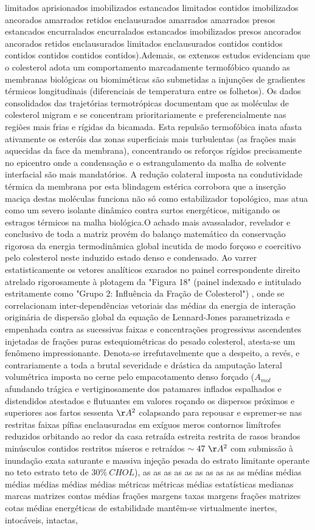 limitados aprisionados imobilizados estancados limitados contidos imobilizados ancorados amarrados retidos enclausurados amarrados amarrados presos estancados encurralados encurralados estancados imobilizados presos ancorados ancorados retidos enclausurados limitados enclausurados contidos contidos contidos contidos contidos contidos).Ademais, os extensos estudos evidenciam que o colesterol adota um comportamento marcadamente termofóbico quando as membranas biológicas ou biomiméticas são submetidas a injunções de gradientes térmicos longitudinais (diferenciais de temperatura entre os folhetos). Os dados consolidados das trajetórias termotrópicas documentam que as moléculas de colesterol migram e se concentram prioritariamente e preferencialmente nas regiões mais frias e rígidas da bicamada. Esta repulsão termofóbica inata afasta ativamente os esteróis das zonas superficiais mais turbulentas (as frações mais aquecidas da face da membrana), concentrando os reforços rígidos precisamente no epicentro onde a condensação e o estrangulamento da malha de solvente interfacial são mais mandatórios. A redução colateral imposta na condutividade térmica da membrana por esta blindagem estérica corrobora que a inserção maciça destas moléculas funciona não só como estabilizador topológico, mas atua como um severo isolante dinâmico contra surtos energéticos, mitigando os estragos térmicos na malha biológica.O achado mais avassalador, revelador e conclusivo de toda a matriz provém do balanço matemático da conservação rigorosa da energia termodinâmica global incutida de modo forçoso e coercitivo pelo colesterol neste induzido estado denso e condensado. Ao varrer estatisticamente os vetores analíticos exarados no painel correspondente direito atrelado rigorosamente à plotagem da "Figura 18" (painel indexado e intitulado estritamente como "Grupo 2: Influência da Fração de Colesterol") , onde se correlacionam inter-dependências vetoriais das médias da energia de interação originária de dispersão global da equação de Lennard-Jones parametrizada e empenhada contra as sucessivas faixas e concentrações progressivas ascendentes injetadas de frações puras estequiométricas do pesado colesterol, atesta-se um fenômeno impressionante. Denota-se irrefutavelmente que a despeito, a revés, e contrariamente a toda a brutal severidade e drástica da amputação lateral volumétrica imposta no cerne pelo empacotamento denso forçado ($A_{mol}$ afundando trágica e vertiginosamente dos patamares inflados espalhados e distendidos atestados e flutuantes em valores roçando os dispersos próximos e superiores aos fartos sessenta $\AA^2$ colapsando para repousar e espremer-se nas restritas faixas pífias enclausuradas em exíguos meros contornos limítrofes reduzidos orbitando ao redor da casa retraída estreita restrita de rasos brandos minúsculos contidos restritos míseros e retraídos $\sim47~\AA^2$ com submissão à inundação exata saturante e massiva injeção pesada do estrato limitante operante no teto estrato teto de $30\%~CHOL$), as as as as as as as as as as médias médias médias médias médias médias métricas métricas médias estatísticas medianas marcas matrizes contas médias frações margens taxas margens frações matrizes cotas médias energéticas de estabilidade mantêm-se virtualmente inertes, intocáveis, intactas, 